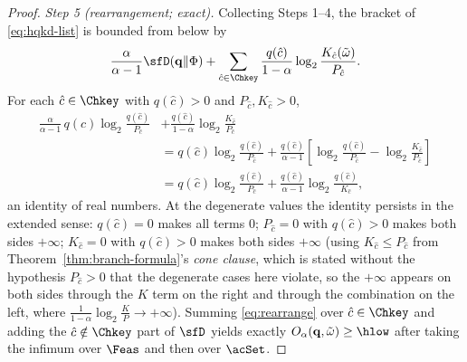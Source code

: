 \begin{proof}
\emph{Step 5 (rearrangement; exact).} Collecting Steps 1--4, the bracket of
\eqref{eq:hqkd-list} is bounded from below by
\begin{equation*}
  \frac{\alpha}{\alpha-1}\sfD(\mathbf q\|\Phi)
  +\sum_{\hat c\in\Chkey}
  \frac{q(\hat c)}{1-\alpha}\log_2
  \frac{K_{\hat c}(\tilde\omega)}{P_{\hat c}} .
\end{equation*}
For each $\hat c\in\Chkey$ with $q(\hat c)>0$ and
$P_{\hat c},K_{\hat c}>0$,
\begin{equation}\label{eq:rearrange}
\begin{split}
  \frac{\alpha}{\alpha-1}\,q(\hat c)\log_2\frac{q(\hat c)}{P_{\hat c}}
  &+\frac{q(\hat c)}{1-\alpha}\log_2\frac{K_{\hat c}}{P_{\hat c}}\\
  &=q(\hat c)\log_2\frac{q(\hat c)}{P_{\hat c}}
  +\frac{q(\hat c)}{\alpha-1}
  \left[\log_2\frac{q(\hat c)}{P_{\hat c}}
  -\log_2\frac{K_{\hat c}}{P_{\hat c}}\right]\\
  &=q(\hat c)\log_2\frac{q(\hat c)}{P_{\hat c}}
  +\frac{q(\hat c)}{\alpha-1}\log_2\frac{q(\hat c)}{K_{\hat c}},
\end{split}
\end{equation}
an identity of real numbers. At the degenerate values the identity persists
in the extended sense: $q(\hat c)=0$ makes all terms $0$; $P_{\hat c}=0$
with $q(\hat c)>0$ makes both sides $+\infty$; $K_{\hat c}=0$ with
$q(\hat c)>0$ makes both sides $+\infty$ (using $K_{\hat c}\le P_{\hat c}$
from Theorem~\ref{thm:branch-formula}'s \emph{cone clause}, which is stated without the
hypothesis $P_{\hat c}>0$ that the degenerate cases here violate, so the
$+\infty$ appears on both sides through
the $K$ term on the right and through the combination on the left, where
$\frac{1}{1-\alpha}\log_2\frac{K}{P}\to+\infty$). Summing
\eqref{eq:rearrange} over $\hat c\in\Chkey$ and adding the
$\hat c\notin\Chkey$ part of $\sfD$ yields exactly
$O_{\alpha}(\mathbf q,\tilde\omega)\ge\hlow$ after taking the infimum over
$\Feas$ and then over $\acSet$.
\end{proof}
